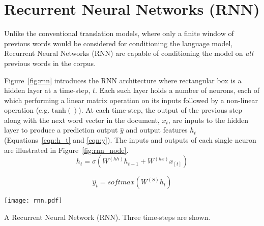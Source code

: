 \documentclass{tufte-handout}
\begin{document}
\section{Recurrent Neural Networks (RNN)}
Unlike the conventional translation models, where only a finite window of previous words would be considered for conditioning the language model, Recurrent Neural Networks (RNN) are capable of conditioning the model on \textit{all} previous words in the corpus.

Figure~\ref{fig:rnn} introduces the RNN architecture where rectangular box is a hidden layer at a time-step, $t$. Each such layer holds a number of neurons, each of which performing a linear matrix operation on its inputs followed by a non-linear operation (e.g. $\operatorname{tanh()}$). At each time-step, the output of the previous step along with the next word vector in the document, $x_t$, are inputs to the hidden layer to produce a prediction output $\hat{y}$ and output features $h_t$ (Equations~\ref{eqn:h_t} and \ref{eqn:y}). The inputs and outputs of each single neuron are illustrated in Figure~\ref{fig:rnn_node}.
\begin{equation}
	h_t = \sigma (W^{(hh)}h_{t-1} + W^{(hx)}x_{[t]})
	\label{eqn:h_t}
\end{equation}

\begin{equation}
	\hat{y}_t = softmax(W^{(S)}h_t)
	\label{eqn:y}
\end{equation}

\begin{marginfigure}
	\centering
	\texttt{[image: rnn.pdf]}
	\caption {A Recurrent Neural Network (RNN). Three time-steps are shown.}
	\label{fig:rnn}
\end{marginfigure}
\end{document}
